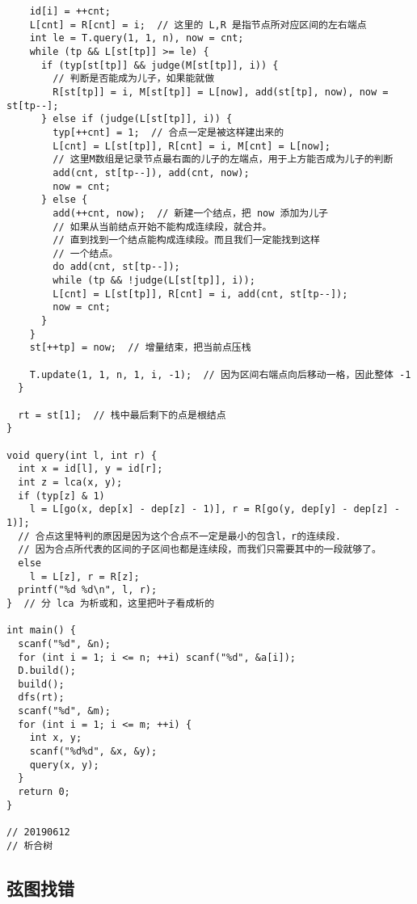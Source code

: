 \documentclass[12pt]{ctexart}
\begin{document}
\begin{lstlisting}
    id[i] = ++cnt;
    L[cnt] = R[cnt] = i;  // 这里的 L,R 是指节点所对应区间的左右端点
    int le = T.query(1, 1, n), now = cnt;
    while (tp && L[st[tp]] >= le) {
      if (typ[st[tp]] && judge(M[st[tp]], i)) {
        // 判断是否能成为儿子，如果能就做
        R[st[tp]] = i, M[st[tp]] = L[now], add(st[tp], now), now = st[tp--];
      } else if (judge(L[st[tp]], i)) {
        typ[++cnt] = 1;  // 合点一定是被这样建出来的
        L[cnt] = L[st[tp]], R[cnt] = i, M[cnt] = L[now];
        // 这里M数组是记录节点最右面的儿子的左端点，用于上方能否成为儿子的判断
        add(cnt, st[tp--]), add(cnt, now);
        now = cnt;
      } else {
        add(++cnt, now);  // 新建一个结点，把 now 添加为儿子
        // 如果从当前结点开始不能构成连续段，就合并。
        // 直到找到一个结点能构成连续段。而且我们一定能找到这样
        // 一个结点。
        do add(cnt, st[tp--]);
        while (tp && !judge(L[st[tp]], i));
        L[cnt] = L[st[tp]], R[cnt] = i, add(cnt, st[tp--]);
        now = cnt;
      }
    }
    st[++tp] = now;  // 增量结束，把当前点压栈

    T.update(1, 1, n, 1, i, -1);  // 因为区间右端点向后移动一格，因此整体 -1
  }

  rt = st[1];  // 栈中最后剩下的点是根结点
}

void query(int l, int r) {
  int x = id[l], y = id[r];
  int z = lca(x, y);
  if (typ[z] & 1)
    l = L[go(x, dep[x] - dep[z] - 1)], r = R[go(y, dep[y] - dep[z] - 1)];
  // 合点这里特判的原因是因为这个合点不一定是最小的包含l，r的连续段.
  // 因为合点所代表的区间的子区间也都是连续段，而我们只需要其中的一段就够了。
  else
    l = L[z], r = R[z];
  printf("%d %d\n", l, r);
}  // 分 lca 为析或和，这里把叶子看成析的

int main() {
  scanf("%d", &n);
  for (int i = 1; i <= n; ++i) scanf("%d", &a[i]);
  D.build();
  build();
  dfs(rt);
  scanf("%d", &m);
  for (int i = 1; i <= m; ++i) {
    int x, y;
    scanf("%d%d", &x, &y);
    query(x, y);
  }
  return 0;
}

// 20190612
// 析合树
\end{lstlisting}

\subsection{弦图找错}
\end{document}
